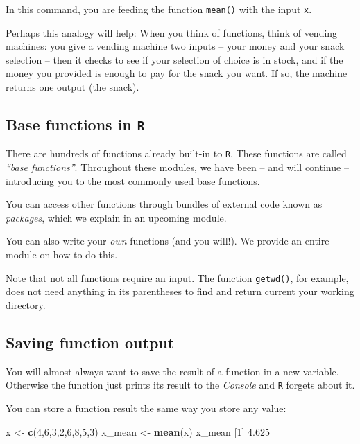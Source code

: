 \documentclass[
]{book}
\newenvironment{Shaded}{\begin{snugshade}}{\end{snugshade}}
\newcommand{\DecValTok}[1]{\textcolor[rgb]{0.00,0.00,0.81}{#1}}
\newcommand{\FloatTok}[1]{\textcolor[rgb]{0.00,0.00,0.81}{#1}}
\newcommand{\FunctionTok}[1]{\textcolor[rgb]{0.13,0.29,0.53}{\textbf{#1}}}
\newcommand{\NormalTok}[1]{#1}
\newcommand{\OtherTok}[1]{\textcolor[rgb]{0.56,0.35,0.01}{#1}}
\begin{document}
In this command, you are feeding the function \texttt{mean()} with the input \texttt{x}.

Perhaps this analogy will help: When you think of functions, think of vending machines: you give a vending machine two inputs -- your money and your snack selection -- then it checks to see if your selection of choice is in stock, and if the money you provided is enough to pay for the snack you want. If so, the machine returns one output (the snack).

\subsection*{\texorpdfstring{Base functions in \texttt{R}}{Base functions in R}}\label{base-functions-in-r}

There are hundreds of functions already built-in to \texttt{R}. These functions are called \emph{``base functions''}. Throughout these modules, we have been -- and will continue -- introducing you to the most commonly used base functions.

You can access other functions through bundles of external code known as \emph{packages}, which we explain in an upcoming module.

You can also write your \emph{own} functions (and you will!). We provide an entire module on how to do this.

Note that not all functions require an input. The function \texttt{getwd()}, for example, does not need anything in its parentheses to find and return current your working directory.

\subsection*{Saving function output}\label{saving-function-output}

You will almost always want to save the result of a function in a new variable. Otherwise the function just prints its result to the \emph{Console} and \texttt{R} forgets about it.

You can store a function result the same way you store any value:

\begin{Shaded}
\begin{Highlighting}[]
\NormalTok{x }\OtherTok{\textless{}{-}} \FunctionTok{c}\NormalTok{(}\DecValTok{4}\NormalTok{,}\DecValTok{6}\NormalTok{,}\DecValTok{3}\NormalTok{,}\DecValTok{2}\NormalTok{,}\DecValTok{6}\NormalTok{,}\DecValTok{8}\NormalTok{,}\DecValTok{5}\NormalTok{,}\DecValTok{3}\NormalTok{) }
\NormalTok{x\_mean }\OtherTok{\textless{}{-}} \FunctionTok{mean}\NormalTok{(x) }
\NormalTok{x\_mean}
\NormalTok{[}\DecValTok{1}\NormalTok{] }\FloatTok{4.625}
\end{Highlighting}
\end{Shaded}
\end{document}
